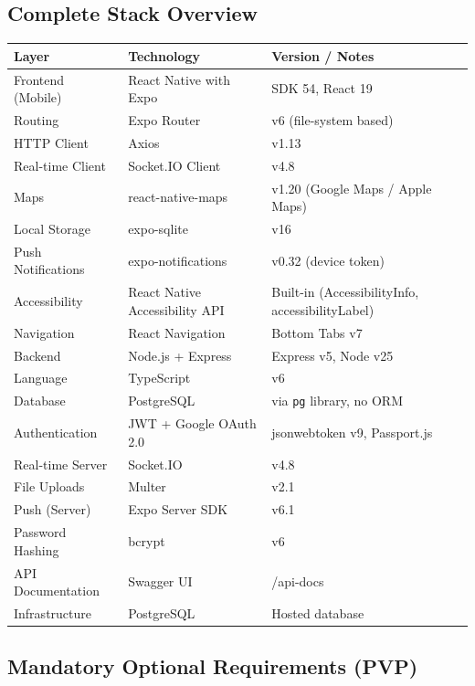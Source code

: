 \documentclass[12pt,a4paper]{article}
\begin{document}
\subsection{Complete Stack Overview}

\begin{tabular}{lll}
\toprule
\textbf{Layer} & \textbf{Technology} & \textbf{Version / Notes} \\
\midrule
Frontend (Mobile) & React Native with Expo & SDK 54, React 19 \\
Routing           & Expo Router           & v6 (file-system based) \\
HTTP Client       & Axios                 & v1.13 \\
Real-time Client  & Socket.IO Client      & v4.8 \\
Maps              & react-native-maps     & v1.20 (Google Maps / Apple Maps) \\
Local Storage     & expo-sqlite           & v16 \\
Push Notifications & expo-notifications   & v0.32 (device token) \\
Accessibility     & React Native Accessibility API & Built-in (AccessibilityInfo, accessibilityLabel) \\
Navigation        & React Navigation      & Bottom Tabs v7 \\
\midrule
Backend           & Node.js + Express     & Express v5, Node v25 \\
Language          & TypeScript            & v6 \\
Database          & PostgreSQL            & via \texttt{pg} library, no ORM \\
Authentication    & JWT + Google OAuth 2.0 & jsonwebtoken v9, Passport.js \\
Real-time Server  & Socket.IO             & v4.8 \\
File Uploads      & Multer                & v2.1 \\
Push (Server)     & Expo Server SDK       & v6.1 \\
Password Hashing  & bcrypt                & v6 \\
API Documentation & Swagger UI            & /api-docs \\
\midrule
Infrastructure    & PostgreSQL            & Hosted database \\
\bottomrule
\end{tabular}

\subsection{Mandatory Optional Requirements (PVP)}
\end{document}
